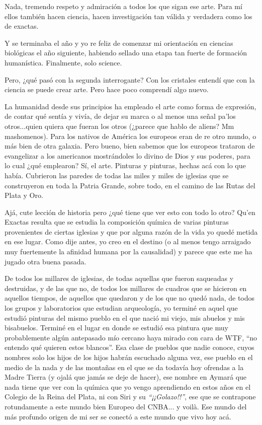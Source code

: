 \documentclass[16pt, a4 paper]{article}
\begin{document}
Nada, tremendo respeto y admiraci\'on a todos los que sigan ese arte. Para m\'i ellos tambi\'en hacen ciencia, hacen investigaci\'on tan v\'alida y verdadera como los de exactas.

Y se terminaba el a\~no y yo re feliz de comenzar mi orientaci\'on en ciencias biol\'ogicas el a\~no siguiente, habiendo sellado una etapa tan fuerte de formaci\'on human\'istica. Finalmente, solo science.

Pero, ¿qu\'e pas\'o con la segunda interrogante? Con los cristales entend\'i que con la ciencia se puede crear arte. Pero hace poco comprend\'i algo nuevo.

La humanidad desde sus principios ha empleado el arte como forma de expresi\'on, de contar qu\'e sent\'ia y viv\'ia, de dejar su marca o al menos una se\~nal pa’los otros...quien quiera que fueran los otros (¿parece que hablo de aliens? Mm mashomenos). Para los nativos de Am\'erica los europeos eran de re otro mundo, o m\'as bien de otra galaxia. Pero bueno, bien sabemos que los europeos trataron de evangelizar a los americanos mostr\'andoles lo divino de Dios y sus poderes, para lo cual ¿qu\'e emplearon? S\'i, el arte. Pinturas y pinturas, hechas ac\'a con lo que hab\'ia. Cubrieron las paredes de todas las miles y miles de iglesias que se construyeron en toda la Patria Grande, sobre todo, en el camino de las Rutas del Plata y Oro.

Aj\'a, cute lecci\'on de historia pero ¿qu\'e tiene que ver esto con todo lo otro? Qu’en Exactas resulta que se estudia la composici\'on qu\'imica de varias pinturas provenientes de ciertas iglesias y que por alguna raz\'on de la vida yo qued\'e metida en ese lugar. Como dije antes, yo creo en el destino (o al menos tengo arraigado muy fuertemente la afinidad humana por la causalidad) y parece que este me ha jugado otra buena pasada. 

De todos los millares de iglesias, de todas aquellas que fueron saqueadas y destruidas, y de las que no, de todos los millares de cuadros que se hicieron en aquellos tiempos, de aquellos que quedaron y de los que no qued\'o nada, de todos los grupos y laboratorios que estudian arqueolog\'ia, yo termin\'e en aquel que estudi\'o pinturas del mismo pueblo en el que naci\'o mi viejo, mis abuelos y mis bisabuelos. Termin\'e en el lugar en donde se estudi\'o esa pintura que muy probablemente alg\'un antepasado m\'io cercano haya mirado con cara de WTF, “no entendo qu\'e quieren estos blancos”. Esa clase de pueblos que nadie conoce, cuyos nombres solo los hijos de los hijos habr\'an escuchado alguna vez, ese pueblo en el medio de la nada y de las monta\~nas en el que se da todav\'ia hoy ofrendas a la Madre Tierra (y ojal\'a que jam\'as se deje de hacer), ese nombre en Aymar\'a que nada tiene que ver con la qu\'imica que yo vengo aprendiendo en estos a\~nos en el Colegio de la Reina del Plata, ni con Siri y su \textit {“¡¡Golazo!!”}, ese que se contrapone rotundamente a este mundo bien Europeo del CNBA... y voilà. Ese mundo del m\'as profundo origen de mi ser se conect\'o a este mundo que vivo hoy ac\'a.
\end{document}
